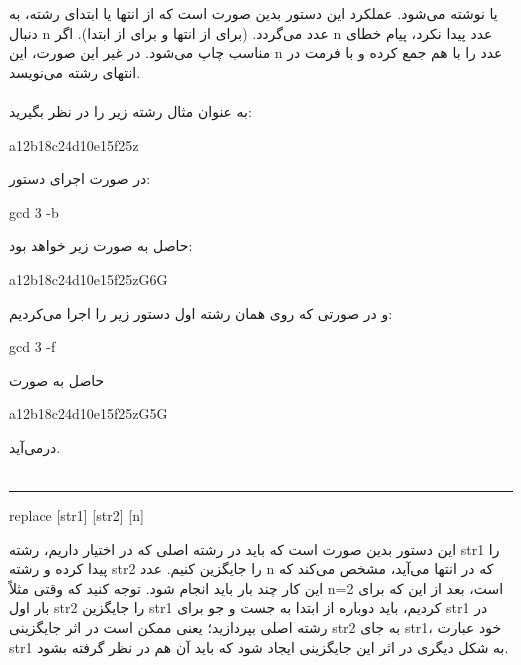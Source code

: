 \documentclass[]{article}
\begin{document}
یا
نوشته می‌شود. عملکرد این دستور بدین صورت است که از انتها یا ابتدای رشته، به دنبال n  عدد می‌گردد. (برای 
 از انتها و برای 
  از ابتدا). اگر n عدد پیدا نکرد، پیام خطای مناسب چاپ می‌شود. در غیر این صورت، این n عدد را با هم جمع کرده و با فرمت
  در انتهای رشته می‌نویسد.\\\\
به عنوان مثال رشته زیر را در نظر بگیرید:
\begin{tcolorbox}[boxrule=0pt]
	\begin{latin}
  	  \large{
		a12b18c24d10e15f25z
		}
	\end{latin}
\end{tcolorbox}
در صورت اجرای دستور:
\begin{tcolorbox}[boxrule=0pt]
	\begin{latin}
  	  \large{
  	  	gcd 3 -b
		}
	\end{latin}
\end{tcolorbox}
حاصل به صورت زیر خواهد بود:
\begin{tcolorbox}[boxrule=0pt]
	\begin{latin}
  	  \large{
  	  	a12b18c24d10e15f25zG6G
		}
	\end{latin}
\end{tcolorbox}
و در صورتی که روی همان رشته اول دستور زیر را اجرا می‌کردیم:
\begin{tcolorbox}[boxrule=0pt]
	\begin{latin}
  	  \large{
  	  	gcd 3 -f
		}
	\end{latin}
\end{tcolorbox}
حاصل به صورت
\begin{tcolorbox}[boxrule=0pt]
	\begin{latin}
  	  \large{
  	  	a12b18c24d10e15f25zG5G
		}
	\end{latin}
\end{tcolorbox}
در‌می‌آید.\\\\
\noindent\rule[0.5ex]{\linewidth}{1pt}
\begin{tcolorbox}[boxrule=0pt]
	\begin{latin}
  	  \large{
  	  	replace [str1] [str2] [n]
		}
	\end{latin}
\end{tcolorbox}
این دستور بدین صورت است که باید در رشته اصلی که در اختیار داریم، رشته str1 را پیدا کرده و رشته str2 را جایگزین کنیم. عدد n که در انتها می‌آید، مشخص می‌کند که این کار چند بار باید انجام شود. توجه کنید که وقتی مثلاً n=2 است، بعد از این که برای بار اول str2 را جایگزین str1 کردیم، باید دوباره از ابتدا به جست و جو برای str1 در رشته اصلی بپردازید؛ یعنی ممکن است در اثر جایگزینی str2 به جای str1، خود عبارت str1 به شکل دیگری در اثر این جایگزینی ایجاد شود که باید آن هم در نظر گرفته بشود.\\\\
\end{document}
